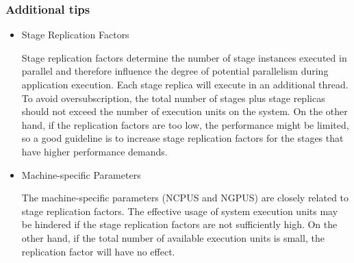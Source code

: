 \subsubsection{Additional tips}
\begin{itemize} 
\item Stage Replication Factors

Stage replication factors determine the number of stage instances executed in parallel and therefore influence the degree of potential parallelism during application execution. Each stage replica will execute in an additional thread. To avoid oversubscription, the total number of stages plus stage replicas should not exceed the number of execution units on the system. On the other hand, if the replication factors are too low, the performance might be limited, so a good guideline is to increase stage replication factors for the stages that have higher performance demands. 
\item Machine-specific Parameters

The machine-specific parameters (NCPUS and NGPUS) are closely related to stage replication factors. The effective usage of system execution units may be hindered if the stage replication factors are not sufficiently high. On the other hand, if the total number of available execution units is small, the replication factor will have no effect. 

\end{itemize}



    
    
